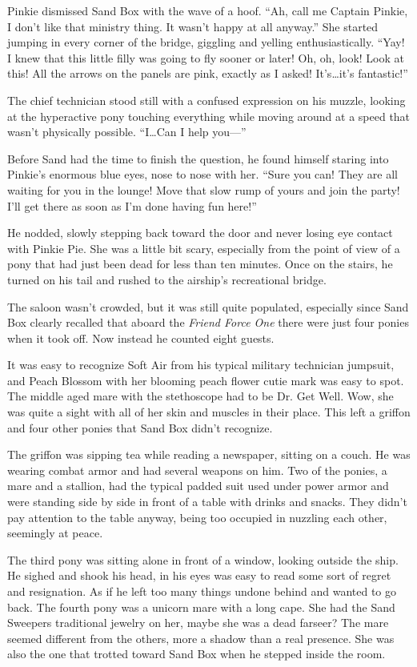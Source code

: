 Pinkie dismissed Sand Box with the wave of a hoof. ``Ah, call me Captain Pinkie, I don't like that ministry thing. It wasn't happy at all anyway.'' She started jumping in every corner of the bridge, giggling and yelling enthusiastically. ``Yay! I knew that this little filly was going to fly sooner or later! Oh, oh, look! Look at this! All the arrows on the panels are pink, exactly as I asked! It's\dots it's fantastic!''

The chief technician stood still with a confused expression on his muzzle, looking at the hyperactive pony touching everything while moving around at a speed that wasn't physically possible. ``I\dots Can I help you---''

Before Sand had the time to finish the question, he found himself staring into Pinkie's enormous blue eyes, nose to nose with her. ``Sure you can! They are all waiting for you in the lounge! Move that slow rump of yours and join the party! I'll get there as soon as I'm done having fun here!''

He nodded, slowly stepping back toward the door and never losing eye contact with Pinkie Pie. She was a little bit scary, especially from the point of view of a pony that had just been dead for less than ten minutes. Once on the stairs, he turned on his tail and rushed to the airship's recreational bridge.

The saloon wasn't crowded, but it was still quite populated, especially since Sand Box clearly recalled that aboard the \emph{Friend Force One}\/ there were just four ponies when it took off. Now instead he counted eight guests.

It was easy to recognize Soft Air from his typical military technician jumpsuit, and Peach Blossom with her blooming peach flower cutie mark was easy to spot. The middle aged mare with the stethoscope had to be Dr. Get Well. Wow, she was quite a sight with all of her skin and muscles in their place. This left a griffon and four other ponies that Sand Box didn't recognize.

The griffon was sipping tea while reading a newspaper, sitting on a couch. He was wearing combat armor and had several weapons on him. Two of the ponies, a mare and a stallion, had the typical padded suit used under power armor and were standing side by side in front of a table with drinks and snacks. They didn't pay attention to the table anyway, being too occupied in nuzzling each other, seemingly at peace.

The third pony was sitting alone in front of a window, looking outside the ship. He sighed and shook his head, in his eyes was easy to read some sort of regret and resignation. As if he left too many things undone behind and wanted to go back. The fourth pony was a unicorn mare with a long cape. She had the Sand Sweepers traditional jewelry on her, maybe she was a dead farseer? The mare seemed different from the others, more a shadow than a real presence. She was also the one that trotted toward Sand Box when he stepped inside the room.

